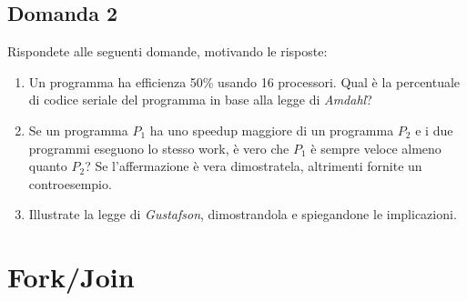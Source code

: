 \newpage

\subsection{Domanda 2}
Rispondete alle seguenti domande, motivando le risposte:
\begin{enumerate}
	\item Un programma ha efficienza 50\% usando 16 processori. Qual è la percentuale di codice seriale del programma in base alla legge di \textit{Amdahl}?
	\item Se un programma $P_1$ ha uno speedup maggiore di un programma $P_2$ e i due programmi eseguono lo stesso work, è vero che $P_1$ è sempre veloce almeno quanto $P_2$? Se l'affermazione è vera dimostratela, altrimenti fornite un controesempio.
	\item Illustrate la legge di \textit{Gustafson}, dimostrandola e spiegandone le implicazioni.
\end{enumerate}

\newpage

\section{Fork/Join}


